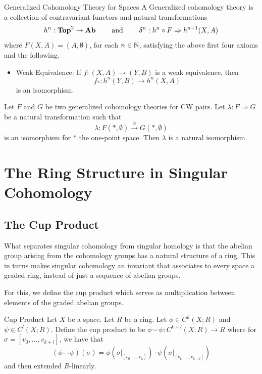 \documentclass[a4paper]{article}
\begin{document}
\begin{defn}{Generalized Cohomology Theory for Spaces}{} A Generalized cohomology theory is a collection of contravariant functors and natural transformations $$h^n:\bold{Top}^2\to\bold{Ab}\;\;\;\;\;\;\;\text{ and }\;\;\;\;\;\;\;\delta^n:h^n\circ F\Rightarrow h^{n+1}(X,A)$$ where $F(X,A)=(A,\emptyset)$, for each $n\in\mathbb{N}$, satisfying the above first four axioms and the following. 
\begin{itemize}
\item Weak Equivalence: If $f:(X,A)\to(Y,B)$ is a weak equivalence, then $$f_\ast:h^n(Y,B)\to h^n(X,A)$$ is an isomorphism. 
\end{itemize}
\end{defn}

\begin{prp}{}{} Let $F$ and $G$ be two generalized cohomology theories for CW pairs. Let $\lambda:F\Rightarrow G$ be a natural transformation such that $$\lambda:F(\ast,\emptyset)\overset{\cong}{\longrightarrow}G(\ast,\emptyset)$$ is an isomorphism for $\ast$ the one-point space. Then $\lambda$ is a natural isomorphism. 
\end{prp}

\pagebreak
\section{The Ring Structure in Singular Cohomology}
\subsection{The Cup Product}
What separates singular cohomology from singular homology is that the abelian group arising from the cohomology groups has a natural structure of a ring. This in turns makes singular cohomology an invariant that associates to every space a graded ring, instead of just a sequence of abelian groups. 

For this, we define the cup product which serves as multiplication between elements of the graded abelian groups. 

\begin{defn}{Cup Product}{} Let $X$ be a space. Let $R$ be a ring. Let $\phi\in C^k(X;R)$ and $\psi\in C^l(X;R)$. Define the cup product to be $\phi\smile\psi:C^{k+l}(X;R)\to R$ where for $\sigma=[v_0,\dots,v_{k+l}]$, we have that $$(\phi\smile\psi)(\sigma)=\phi(\sigma|_{[v_0,\dots,v_k]})\cdot\psi(\sigma|_{[v_k,\dots,v_{k+l}]})$$ and then extended $R$-linearly. 
\end{defn}
\end{document}
